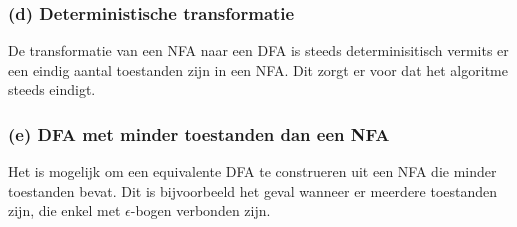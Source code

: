 \subsubsection*{(d) Deterministische transformatie}
De transformatie van een NFA naar een DFA is steeds determinisitisch vermits er een eindig aantal toestanden zijn in een NFA. Dit zorgt er voor dat het algoritme steeds eindigt.

\subsubsection*{(e) DFA met minder toestanden dan een NFA}

Het is mogelijk om een equivalente DFA te construeren uit een NFA die minder toestanden bevat. Dit is bijvoorbeeld het geval wanneer er meerdere toestanden zijn, die enkel met $\epsilon$-bogen verbonden zijn.